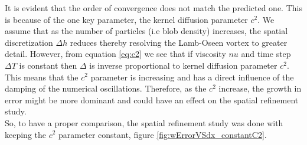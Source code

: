 It is evident that the order of convergence does not match the predicted one. This is because of the one key parameter, the kernel diffusion parameter $c^2$. We assume that as the number of particles (i.e blob density) increases, the spatial discretization $\Delta h$ reduces thereby resolving the Lamb-Oseen vortex to greater detail. However, from equation \ref{eq:c2} we see that if viscosity $nu$ and time step $\Delta T$ is constant then $\Delta $ is inverse proportional to kernel diffusion parameter $c^2$. This means that the $c^2$ parameter is increasing and has a direct influence of the damping of the numerical oscillations. Therefore, as the $c^2$ increase, the growth in error might be more dominant and could have an effect on the spatial refinement study.\\

So, to have a proper comparison, the spatial refinement study was done with keeping the $c^2$ parameter constant, figure \ref{fig:wErrorVSdx_constantC2}.

